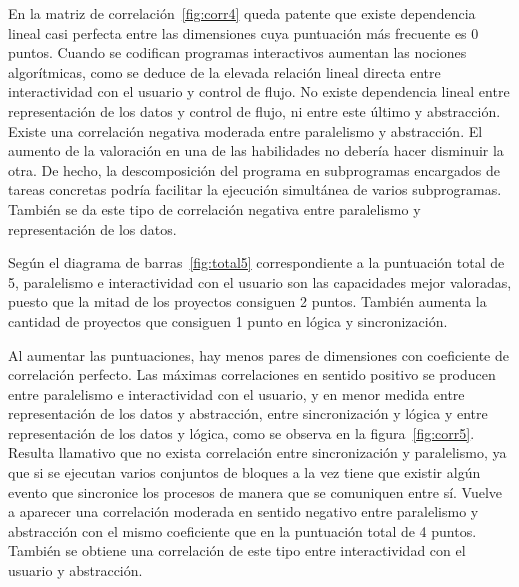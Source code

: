 \documentclass[a4paper, 12pt]{book}
\begin{document}
En la matriz de correlación~\ref{fig:corr4} queda patente que existe dependencia lineal casi perfecta entre las dimensiones cuya puntuación más frecuente es 0 puntos. Cuando se codifican programas interactivos aumentan las nociones algorítmicas, como se deduce de la elevada relación lineal directa entre interactividad con el usuario y control de flujo. No existe dependencia lineal entre representación de los datos y control de flujo, ni entre este último y abstracción. Existe una correlación negativa moderada entre paralelismo y abstracción. El aumento de la valoración en una de las habilidades no debería hacer disminuir la otra. De hecho, la descomposición del programa en subprogramas encargados de tareas concretas podría facilitar la ejecución simultánea de varios subprogramas. También se da este tipo de correlación negativa entre paralelismo y representación de los datos.

Según el diagrama de barras~\ref{fig:total5} correspondiente a la puntuación total de 5, paralelismo e interactividad con el usuario son las capacidades mejor valoradas, puesto que la mitad de los proyectos consiguen 2 puntos. También aumenta la cantidad de proyectos que consiguen 1 punto en lógica y sincronización.

Al aumentar las puntuaciones, hay menos pares de dimensiones con coeficiente de correlación perfecto. Las máximas correlaciones en sentido positivo se producen entre paralelismo e interactividad con el usuario, y en menor medida entre representación de los datos y abstracción, entre sincronización y lógica y entre representación de los datos y lógica, como se observa en la figura~\ref{fig:corr5}. Resulta llamativo que no exista correlación entre sincronización y paralelismo, ya que si se ejecutan varios conjuntos de bloques a la vez tiene que existir algún evento que sincronice los procesos de manera que se comuniquen entre sí. Vuelve a aparecer una correlación moderada en sentido negativo entre paralelismo y abstracción con el mismo coeficiente que en la puntuación total de 4 puntos. También se obtiene una correlación de este tipo entre interactividad con el usuario y abstracción.
\end{document}
